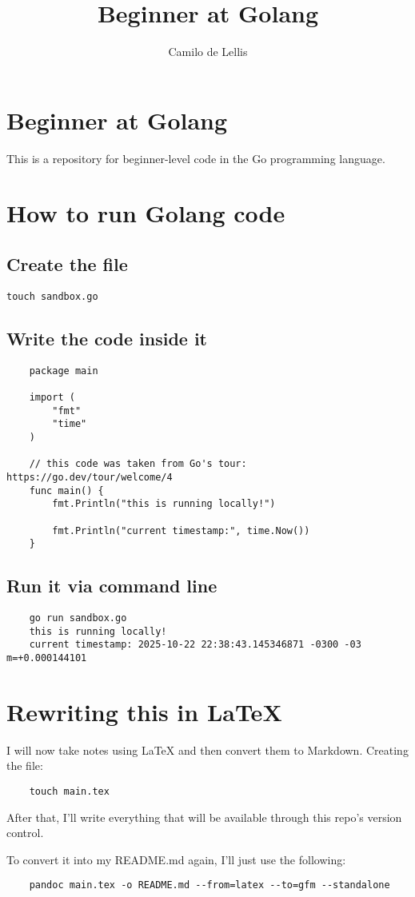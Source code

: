 \documentclass{article}
\title{Beginner at Golang}
\author{Camilo de Lellis}
\begin{document}
\maketitle
\tableofcontents

\section{Beginner at Golang}
This is a repository for beginner-level code in the Go programming language.

\section{How to run Golang code}

\subsection{Create the file}
\begin{verbatim}
touch sandbox.go
\end{verbatim}

\subsection{Write the code inside it}
\begin{verbatim}
    package main
    
    import (
        "fmt"
        "time"
    )
    
    // this code was taken from Go's tour: https://go.dev/tour/welcome/4
    func main() {
        fmt.Println("this is running locally!")
    
        fmt.Println("current timestamp:", time.Now())
    }
\end{verbatim}

\subsection{Run it via command line}
\begin{verbatim}
    go run sandbox.go
    this is running locally!
    current timestamp: 2025-10-22 22:38:43.145346871 -0300 -03 m=+0.000144101
\end{verbatim}

\section{Rewriting this in \LaTeX}
I will now take notes using \LaTeX{} and then convert them to Markdown. Creating the file:

\begin{verbatim}
    touch main.tex
\end{verbatim}

After that, I'll write everything that will be available through this repo's version control.

To convert it into my README.md again, I'll just use the following:
\begin{verbatim}
    pandoc main.tex -o README.md --from=latex --to=gfm --standalone
\end{verbatim}



\end{document}
